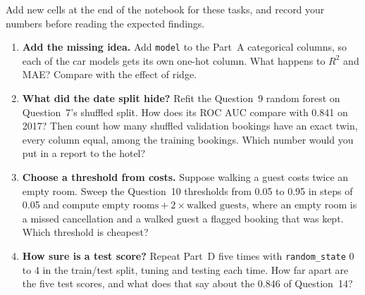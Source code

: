 \begin{yourturn}
Add new cells at the end of the notebook for these tasks, and record your numbers before reading the expected findings.
\begin{enumerate}
  \item \textbf{Add the missing idea.} Add \texttt{model} to the Part~A categorical columns, so each of the car models gets its own one-hot column. What happens to $R^2$ and MAE? Compare with the effect of ridge.
  \item \textbf{What did the date split hide?} Refit the Question~9 random forest on Question~7's shuffled split. How does its ROC AUC compare with 0.841 on 2017? Then count how many shuffled validation bookings have an exact twin, every column equal, among the training bookings. Which number would you put in a report to the hotel?
  \item \textbf{Choose a threshold from costs.} Suppose walking a guest costs twice an empty room. Sweep the Question~10 thresholds from 0.05 to 0.95 in steps of 0.05 and compute $\text{empty rooms}+2\times\text{walked guests}$, where an empty room is a missed cancellation and a walked guest a flagged booking that was kept. Which threshold is cheapest?
  \item \textbf{How sure is a test score?} Repeat Part~D five times with \texttt{random\_state} 0 to 4 in the train/test split, tuning and testing each time. How far apart are the five test scores, and what does that say about the 0.846 of Question~14?
\end{enumerate}
\end{yourturn}

